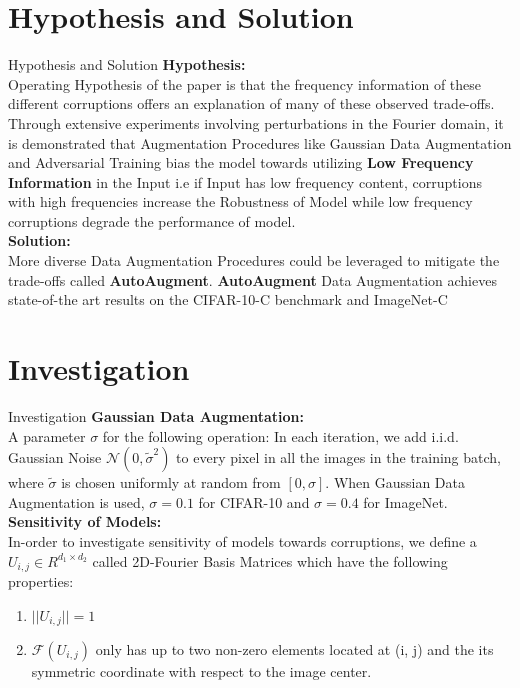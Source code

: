 \documentclass[8pt]{beamer}
\begin{document}
\section{Hypothesis and Solution}
\begin{frame}{Hypothesis and Solution}
\textbf{Hypothesis:}\\
\qquad Operating Hypothesis of the paper is that the frequency information of these different corruptions offers an explanation of many of these observed trade-offs. Through extensive experiments involving perturbations in the Fourier domain, it is demonstrated that Augmentation Procedures like Gaussian Data Augmentation and Adversarial Training bias the model towards utilizing \textbf{Low Frequency Information} in the Input i.e if Input has low frequency content, corruptions with high frequencies increase the Robustness of Model while low frequency corruptions degrade the performance of model.\\
\vspace{0.2in}
\textbf{Solution:}\\
\qquad More diverse Data Augmentation Procedures could be leveraged to mitigate the trade-offs called \textbf{AutoAugment}. \textbf{AutoAugment} Data Augmentation achieves state-of-the art results on the CIFAR-10-C benchmark and ImageNet-C
\end{frame}

\section{Investigation}
\begin{frame}{Investigation}
\textbf{Gaussian Data Augmentation:}\\
\qquad A parameter $\sigma$ for the following operation: In each iteration, we add i.i.d. Gaussian Noise $\mathcal{N}(0,\tilde{\sigma}^2)$ to every pixel in all the images in the training batch, where $\tilde{\sigma}$ is chosen uniformly at random from $[0, \sigma]$.  When Gaussian Data Augmentation is used, $\sigma = 0.1$ for CIFAR-10 and $\sigma = 0.4$ for ImageNet.
\vspace{0.1in}
\textbf{Sensitivity of Models:}\\
In-order to investigate sensitivity of models towards corruptions, we define a $U_{i,j} \in R^{d_1 \times d_2}$ called 2D-Fourier Basis Matrices which have the following properties:\\
\begin{enumerate}
    \item $||U_{i,j}|| = 1$
    \item $\mathcal{F}(U_{i,j})$ only has up to two non-zero elements located at (i, j) and the its symmetric coordinate with respect to the image center.
\end{enumerate}
\end{frame}
\end{document}
